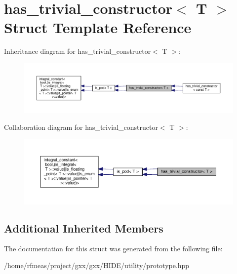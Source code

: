 \hypertarget{structhas__trivial__constructor}{}\section{has\+\_\+trivial\+\_\+constructor$<$ T $>$ Struct Template Reference}
\label{structhas__trivial__constructor}


Inheritance diagram for has\+\_\+trivial\+\_\+constructor$<$ T $>$\+:
\nopagebreak
\begin{figure}[H]
\begin{center}
\leavevmode
\includegraphics[width=350pt]{structhas__trivial__constructor__inherit__graph}
\end{center}
\end{figure}


Collaboration diagram for has\+\_\+trivial\+\_\+constructor$<$ T $>$\+:
\nopagebreak
\begin{figure}[H]
\begin{center}
\leavevmode
\includegraphics[width=350pt]{structhas__trivial__constructor__coll__graph}
\end{center}
\end{figure}
\subsection*{Additional Inherited Members}


The documentation for this struct was generated from the following file\+:\begin{DoxyCompactItemize}
\item 
/home/rfmeas/project/gxx/gxx/\+H\+I\+D\+E/utility/prototype.\+hpp\end{DoxyCompactItemize}
